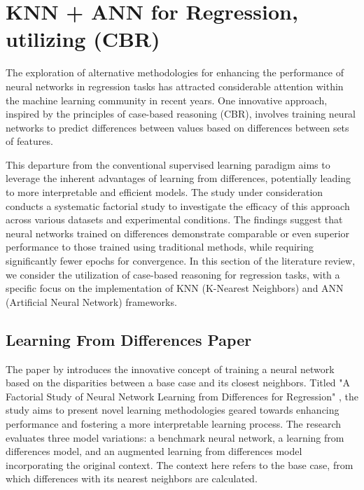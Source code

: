\documentclass[a4paper, 12pt]{report}
\begin{document}
\section{KNN + ANN for Regression, utilizing (CBR)}

The exploration of alternative methodologies for enhancing the performance of neural networks in regression tasks has attracted considerable attention within the machine 
learning community in recent years. One innovative approach, inspired by the principles of case-based reasoning (CBR), 
involves training neural networks to predict differences between values based on differences between sets of features.

This departure from the conventional supervised learning paradigm aims to leverage the inherent advantages of learning from differences, potentially 
leading to more interpretable and efficient models. The study under consideration \cite{learningFromDifferences2022} conducts a 
systematic factorial study to investigate the efficacy of this approach across various datasets and experimental conditions. 
The findings suggest that neural networks trained on differences demonstrate comparable or even superior performance to those trained using traditional methods, 
while requiring significantly fewer epochs for convergence. In this section of the literature review, we consider the utilization of case-based reasoning for regression tasks, 
with a specific focus on the implementation of KNN (K-Nearest Neighbors) and ANN (Artificial Neural Network) frameworks.

\subsection{Learning From Differences Paper}

The paper by \cite{learningFromDifferences2022} introduces the innovative concept of training a neural network based on the disparities between a base case and its closest neighbors. 
Titled "A Factorial Study of Neural Network Learning from Differences for Regression" \cite{learningFromDifferences2022}, 
the study aims to present novel learning methodologies geared towards enhancing performance and fostering a more interpretable learning process. 
The research evaluates three model variations: a benchmark neural network, a learning from differences model, and an augmented learning from differences model incorporating the original context. 
The context here refers to the base case, from which differences with its nearest neighbors are calculated.
\end{document}
